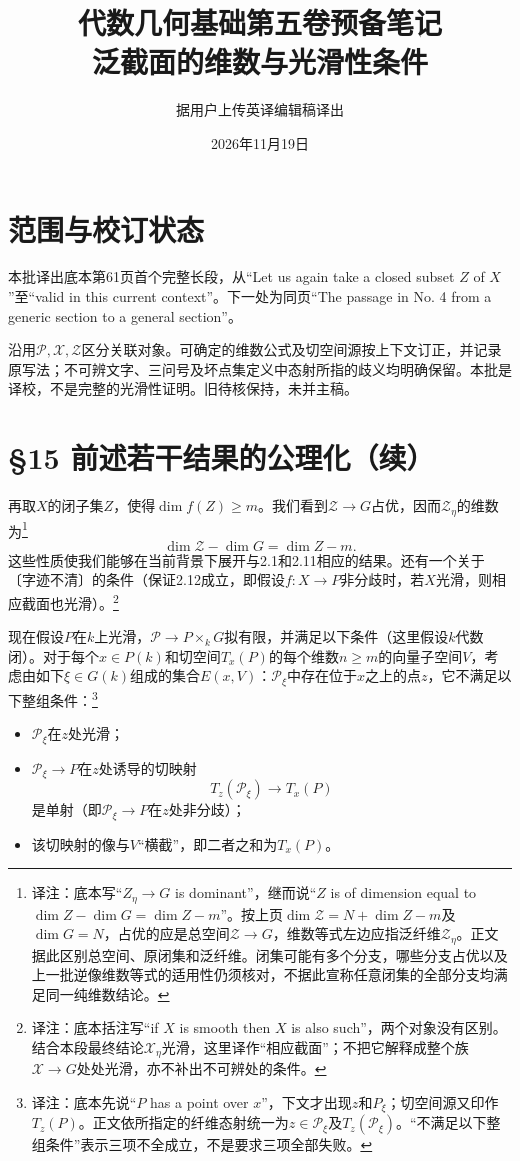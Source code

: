\documentclass[openany,fontset=fandol]{ctexbook}
\newcommand{\note}[1]{\unskip\nobreak\footnote{译注：#1}}
\begin{document}
\title{代数几何基础第五卷预备笔记\\泛截面的维数与光滑性条件}
\author{据用户上传英译编辑稿译出}
\date{2026年11月19日}
\maketitle
\chapter*{范围与校订状态}
本批译出底本第61页首个完整长段，从“Let us again take a closed subset $Z$ of $X$”至“valid in this current context”。下一处为同页“The passage in No. 4 from a generic section to a general section”。

沿用$\mathcal P,\mathcal X,\mathcal Z$区分关联对象。可确定的维数公式及切空间源按上下文订正，并记录原写法；不可辨文字、三问号及坏点集定义中态射所指的歧义均明确保留。本批是译校，不是完整的光滑性证明。旧待核保持，未并主稿。
\chapter*{§15 前述若干结果的公理化（续）}
再取$X$的闭子集$Z$，使得$\dim f(Z)\geq m$。我们看到$\mathcal Z\to G$占优，因而$\mathcal Z_\eta$的维数为\note{底本写“$Z_\eta\to G$ is dominant”，继而说“$Z$ is of dimension equal to $\dim Z-\dim G=\dim Z-m$”。按上页$\dim\mathcal Z=N+\dim Z-m$及$\dim G=N$，占优的应是总空间$\mathcal Z\to G$，维数等式左边应指泛纤维$\mathcal Z_\eta$。正文据此区别总空间、原闭集和泛纤维。闭集可能有多个分支，哪些分支占优以及上一批逆像维数等式的适用性仍须核对，不据此宣称任意闭集的全部分支均满足同一纯维数结论。}
\[
\dim\mathcal Z-\dim G=\dim Z-m.
\]
这些性质使我们能够在当前背景下展开与2.1和2.11相应的结果。还有一个关于〔字迹不清〕的条件（保证2.12成立，即假设$f:X\to P$非分歧时，若$X$光滑，则相应截面也光滑）。\note{底本括注写“if $X$ is smooth then $X$ is also such”，两个对象没有区别。结合本段最终结论$\mathcal X_\eta$光滑，这里译作“相应截面”；不把它解释成整个族$\mathcal X\to G$处处光滑，亦不补出不可辨处的条件。}

现在假设$P$在$k$上光滑，$\mathcal P\to P\times_kG$拟有限，并满足以下条件（这里假设$k$代数闭）。对于每个$x\in P(k)$和切空间$T_x(P)$的每个维数$n\geq m$的向量子空间$V$，考虑由如下$\xi\in G(k)$组成的集合$E(x,V)$：$\mathcal P_\xi$中存在位于$x$之上的点$z$，它不满足以下整组条件：\note{底本先说“$P$ has a point over $x$”，下文才出现$z$和$P_\xi$；切空间源又印作$T_z(P)$。正文依所指定的纤维态射统一为$z\in\mathcal P_\xi$及$T_z(\mathcal P_\xi)$。“不满足以下整组条件”表示三项不全成立，不是要求三项全部失败。}
\begin{itemize}
\item $\mathcal P_\xi$在$z$处光滑；
\item $\mathcal P_\xi\to P$在$z$处诱导的切映射
\[
T_z(\mathcal P_\xi)\longrightarrow T_x(P)
\]
是单射（即$\mathcal P_\xi\to P$在$z$处非分歧）；
\item 该切映射的像与$V$“横截”，即二者之和为$T_x(P)$。
\end{itemize}
\end{document}
